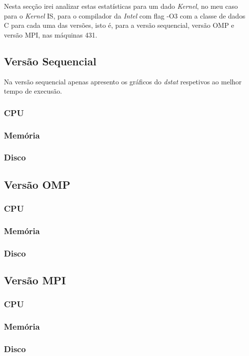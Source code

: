 \documentclass[conference,compsoc]{IEEEtran}
\begin{document}
Nesta secção irei analizar estas estatísticas para um dado \textit{Kernel}, no meu caso para o \textit{Kernel} IS, para o compilador da \textit{Intel} com flag -O3 com a classe de dados C para cada uma das versões, isto é, para a versão sequencial, versão OMP e versão MPI, nas máquinas 431.

\subsection{Versão Sequencial}
Na versão sequencial apenas apresento os gráficos do \textit{dstat} respetivos ao melhor tempo de execusão.
\subsubsection{CPU}
\subsubsection{Memória}
\subsubsection{Disco}
\subsection{Versão OMP}
\subsubsection{CPU}
\subsubsection{Memória}
\subsubsection{Disco}
\subsection{Versão MPI}
\subsubsection{CPU}
\subsubsection{Memória}
\subsubsection{Disco}
\end{document}
